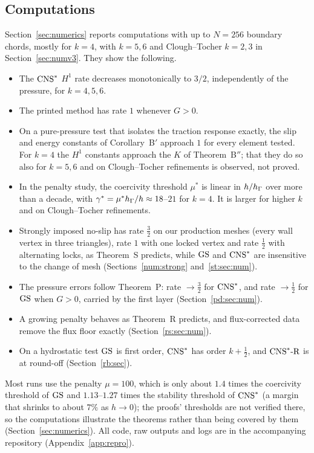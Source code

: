 \subsection*{Computations}
Section~\ref{sec:numerics} reports computations with up to $N=256$ boundary chords, mostly for $k=4$, with $k=5,6$ and Clough--Tocher $k=2,3$ in Section~\ref{sec:numv3}. They show the following.
\begin{itemize}
\item The $\mathrm{CNS}^\ast$ $H^1$ rate decreases monotonically to $3/2$, independently of the pressure, for $k=4,5,6$.
\item The printed method has rate $1$ whenever $G>0$.
\item On a pure-pressure test that isolates the traction response exactly, the slip and energy constants of Corollary~B$'$ approach $1$ for every element tested. For $k=4$ the $H^1$ constants approach the $K$ of Theorem~B$''$; that they do so also for $k=5,6$ and on Clough--Tocher refinements is observed, not proved.
\item In the penalty study, the coercivity threshold $\mu^\ast$ is linear in $h/h_\Gamma$ over more than a decade, with $\gamma^\ast=\mu^\ast h_\Gamma/h\approx18$--$21$ for $k=4$. It is larger for higher $k$ and on Clough--Tocher refinements.
\item Strongly imposed no-slip has rate $\frac32$ on our production meshes (every wall vertex in three triangles), rate $1$ with one locked vertex and rate $\frac12$ with alternating locks, as Theorem~S predicts, while $\mathrm{GS}$ and $\mathrm{CNS}^\ast$ are insensitive to the change of mesh (Sections~\ref{num:strong} and~\ref{st:sec:num}).
\item The pressure errors follow Theorem~P: rate $\to\frac32$ for $\mathrm{CNS}^\ast$, and rate $\to\frac12$ for $\mathrm{GS}$ when $G>0$, carried by the first layer (Section~\ref{pd:sec:num}).
\item A growing penalty behaves as Theorem~R predicts, and flux-corrected data remove the flux floor exactly (Section~\ref{rs:sec:num}).
\item On a hydrostatic test $\mathrm{GS}$ is first order, $\mathrm{CNS}^\ast$ has order $k+\frac12$, and $\mathrm{CNS}^\ast\text{-R}$ is at round-off (Section~\ref{rb:sec}).
\end{itemize}
Most runs use the penalty $\mu=100$, which is only about $1.4$ times the coercivity threshold of $\mathrm{GS}$ and $1.13$--$1.27$ times the stability threshold of $\mathrm{CNS}^\ast$ (a margin that shrinks to about $7\%$ as $h\to0$); the proofs' thresholds are not verified there, so the computations illustrate the theorems rather than being covered by them (Section~\ref{sec:numerics}).
All code, raw outputs and logs are in the accompanying repository (Appendix~\ref{app:repro}).

